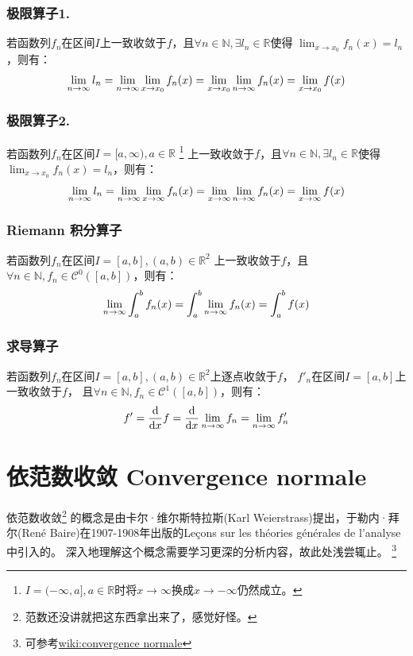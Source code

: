 \documentclass[12pt, a4paper, oneside]{ctexbook}
\begin{document}
  \subsubsection{极限算子1.}
  若函数列$f_n$在区间$I$上一致收敛于$f$，且$\forall n\in\mathbb{N}, \exists l_n\in\mathbb{R}$使得
  $\lim_{x \to x_0}f_n(x)=l_n$，则有：
  \begin{equation}
    \notag
    \lim_{n \to \infty}l_n= \lim_{n \to \infty}\lim_{x \to x_0}f_n(x)
    =\lim_{x \to x_0}\lim_{n \to \infty}f_n(x)=\lim_{x \to x_0}f(x)   
  \end{equation}
  \subsubsection{极限算子2.}
  若函数列$f_n$在区间$I=[a,\infty), a\in\mathbb{R}$
    \footnote{$I=(-\infty,a], a\in\mathbb{R}$时将$x \to \infty$换成$x \to -\infty$仍然成立。}
  上一致收敛于$f$，且$\forall n\in\mathbb{N}, \exists l_n\in\mathbb{R}$使得
  $\lim_{x \to x_0}f_n(x)=l_n$，则有：
  \begin{equation}
    \notag
    \lim_{n \to \infty}l_n= \lim_{n \to \infty}\lim_{x \to \infty}f_n(x)
    =\lim_{x \to \infty}\lim_{n \to \infty}f_n(x)=\lim_{x \to \infty}f(x)   
  \end{equation}
  \subsubsection{Riemann 积分算子}
  若函数列$f_n$在区间$I=[a,b], (a,b)\in\mathbb{R}^2$
  上一致收敛于$f$，且$\forall n\in\mathbb{N}, f_n\in\mathcal{C} ^0([a,b])$，则有：
  \begin{equation}
    \notag
    \lim_{n \to \infty}\int_{a}^{b} f_n(x)
    =\int_{a}^{b} \lim_{n \to \infty}f_n(x)=\int_{a}^{b} f(x)   
  \end{equation}
  \subsubsection{求导算子}
  若函数列$f_n$在区间$I=[a,b], (a,b)\in\mathbb{R}^2$上逐点收敛于$f$，
  $f'_n$在区间$I=[a,b]$上一致收敛于$f$，
  且$\forall n\in\mathbb{N}, f_n\in\mathcal{C} ^1([a,b])$，则有：
  \begin{equation}
    \notag
    f'=\frac{\mathrm{d} }{\mathrm{d} x}f
    =\frac{\mathrm{d} }{\mathrm{d} x} \lim_{n \to \infty} f_n
    =\lim_{n \to \infty}f'_n  
  \end{equation}



\section{依范数收敛 Convergence normale}
  依范数收敛\footnote{范数还没讲就把这东西拿出来了，感觉好怪。}%
  的概念是由卡尔·维尔斯特拉斯(Karl Weierstrass)提出，于勒内·拜尔(René Baire)在1907-1908年出版的Leçons sur les théories générales de l'analyse中引入的。
  深入地理解这个概念需要学习更深的分析内容，故此处浅尝辄止。
  \footnote{可参考\href{https://fr.wikipedia.org/wiki/Convergence_normale}{wiki:convergence normale}}\\
\end{document}
